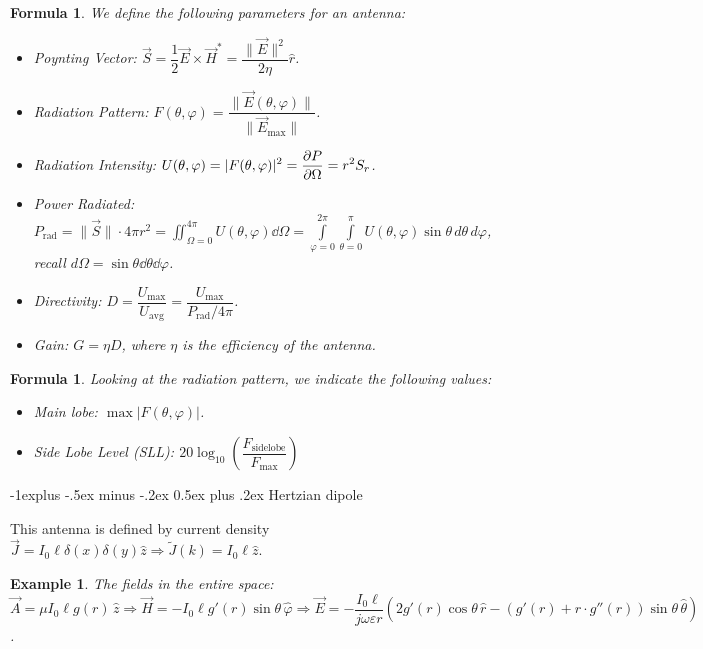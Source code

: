 \documentclass[11pt,landscape]{article}
\makeatletter
\let\eps\varepsilon
\newtheorem{formula}[definition]{Formula}
\newtheorem{example}[definition]{Example}
\renewcommand{\subsection}{\@startsection{subsection}{2}{0mm}%
                                {-1explus -.5ex minus -.2ex}%
                                {0.5ex plus .2ex}%
                                {\normalfont\normalsize\bfseries}}
\makeatother
\begin{document}
\begin{multicols}{3}
\begin{formula}
    We define the following parameters for an antenna:
    \begin{itemize}
        \item Poynting Vector: $\vec{S}=\dfrac{1}{2}\vec{E}\times\vec{H}^*=\dfrac{\|\vec{E}\|^2}{2\eta}\hat{r}$.
        \item Radiation Pattern: $F(\theta, \varphi) = \dfrac{\|\vec{E}(\theta,\varphi)\|}{\|\vec{E}_\text{max}\|}$.
        \item Radiation Intensity: $\displaystyle U(\theta,\varphi) = |F(\theta,\varphi)|^2=\pdv{P}{\Omega}=r^2S_r$.
        \item Power Radiated: $P_\text{rad}=\|\vec{S}\|\cdot 4\pi r^2 = \displaystyle\iint_{\Omega=0}^{4\pi}U(\theta,\varphi)\dd{\Omega}=\int\limits_{\varphi=0}^{2\pi}\int\limits_{\theta=0}^{\pi}U(\theta,\varphi)\sin\theta \,d \theta\,d\varphi$, recall $d\Omega=\sin{\theta}\dd{\theta}\dd{\varphi}$.
        \item Directivity: $D=\dfrac{U_\text{max}}{U_\text{avg}}=\dfrac{U_\text{max}}{P_\text{rad}/4\pi}$.
        \item Gain: $G=\eta D$, where $\eta$ is the efficiency of the antenna.
    \end{itemize}
\end{formula}

\begin{formula}
    Looking at the radiation pattern, we indicate the following values:
    \begin{itemize}
        \item Main lobe: $\max|F(\theta,\varphi)|$.
        \item Side Lobe Level (SLL): $20\log_{10}\left(\dfrac{F_\text{sidelobe}}{F_\text{max}}\right)$
    \end{itemize}
\end{formula}

\subsection{Hertzian dipole}

This antenna is defined by current density $\vec{J}=I_0\ell \delta(x)\delta(y)\hat{z}\Rightarrow \tilde{J}(k)=I_0\ell\hat{z}$.

\begin{example}
    The fields in the entire space: $\vec{A}=\mu I_0\ell g(r)\,\hat{z}\Rightarrow\vec{H}=-I_0\ell g'(r)\sin{\theta}\,\hat{\varphi}\Rightarrow \vec{E}=-\dfrac{I_0\ell}{j\omega\eps r}\left(2g'(r)\cos{\theta}\,\hat{r}-(g'(r)+r\cdot g''(r))\sin{\theta}\,\hat{\theta}\right)$.
\end{example}


\end{multicols}
\end{document}
